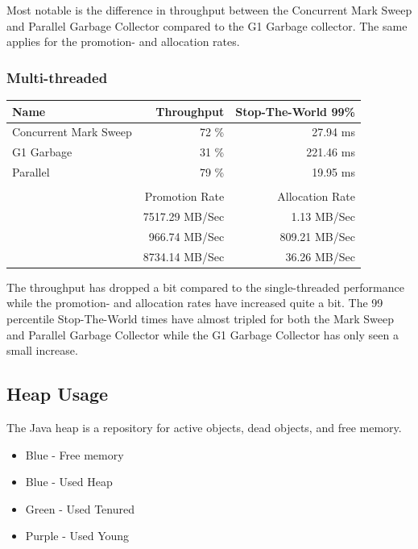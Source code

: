 \documentclass[11pt,a4paper]{article}
\begin{document}
\vspace{10px}
Most notable is the difference in throughput between the Concurrent Mark Sweep and Parallel Garbage Collector compared to the G1 Garbage collector. The same applies for the promotion- and allocation rates. 

\subsubsection*{Multi-threaded}
\begin{tabular}{lrr}
\hline
Name                    & Throughput          & Stop-The-World 99\%   \\ \hline
Concurrent Mark Sweep   & 72 \%               & 27.94 ms              \\
G1 Garbage              & 31 \%               & 221.46 ms             \\
Parallel                & 79 \%               & 19.95 ms               \\
&&\\
\hline
                        & Promotion Rate      & Allocation Rate       \\ \hline
                        & 7517.29 MB/Sec      & 1.13 MB/Sec           \\
                        & 966.74 MB/Sec       & 809.21 MB/Sec       \\
                        & 8734.14 MB/Sec      & 36.26 MB/Sec
\end{tabular}

\vspace{10px}
The throughput has dropped a bit compared to the single-threaded performance while the promotion- and allocation rates have increased quite a bit. The 99 percentile Stop-The-World times have almost tripled for both the  Mark Sweep and Parallel Garbage Collector while the G1 Garbage Collector has only seen a small increase.

\newpage
\subsection{Heap Usage}
\begin{small}
    The Java heap is a repository for active objects, dead objects, and free memory.
    \begin{itemize}
        \item Blue - Free memory
        \item Blue - Used Heap
        \item Green - Used Tenured
        \item Purple - Used Young
    \end{itemize}
\end{small}
\end{document}

